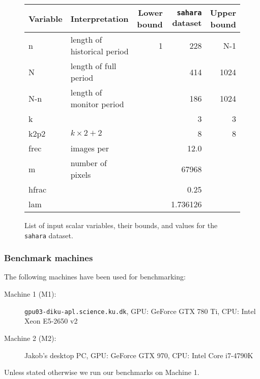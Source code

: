 \begin{figure}[H]
    \centering
    \begin{tabular}{l l r r r}
    \textbf{Variable} & \textbf{Interpretation}              & \textbf{Lower bound} & \textbf{\texttt{sahara} dataset} & \textbf{Upper bound} \\ \hline
        n                & length of historical period & 1           & 228                     & N-1 \\
        N                & length of full period       &             & 414                     & 1024   \\
        N-n              & length of monitor period    &             & 186                     & 1024 \\
        k                &                             &             & 3                       & 3 \\
        k2p2             & \(k\times2 + 2\)            &             & 8                       & 8 \\
        frec             & images per                  &             & 12.0                    & \\
        m                & number of pixels            &             & 67968                   & \\
        hfrac            &                             &             & 0.25                    & \\
        lam              &                             &             & 1.736126                &
    \end{tabular}
    \caption{List of input scalar variables, their bounds, and values for the \texttt{sahara} dataset.}
    \label{tbl:scalars}
\end{figure}



\subsubsection{Benchmark machines}\label{sec:machines}

The following machines have been used for benchmarking:
%
\begin{description}
  \item[Machine 1 (M1): ]
    \texttt{gpu03-diku-apl.science.ku.dk}, GPU: GeForce GTX 780 Ti, CPU: Intel Xeon E5-2650 v2
  \item[Machine 2 (M2): ]
    Jakob's desktop PC, GPU: GeForce GTX 970, CPU: Intel Core i7-4790K
\end{description}

Unless stated otherwise we run our benchmarks on Machine 1.

